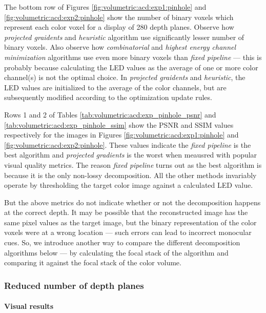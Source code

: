 The bottom row of Figures \ref{fig:volumetric:acd:exp1:pinhole} and \ref{fig:volumetric:acd:exp2:pinhole} show the number of binary voxels which represent each color voxel for a display of 280 depth planes. Observe how \emph{projected graidents} and \emph{heuristic} algorithm use significantly lesser number of binary voxels. Also observe how \emph{combinatorial} and \emph{highest energy channel minimization} algorithms use even more binary voxels than \emph{fixed pipeline} --- this is probably because calculating the LED values as the average of one or more color channel(s) is not the optimal choice. In \emph{projected graidents} and \emph{heuristic}, the LED values are initialized to the average of the color channels, but are subsequently modified according to the optimization update rules. 

Rows 1 and 2 of Tables \ref{tab:volumetric:acd:exp_pinhole_psnr} and \ref{tab:volumetric:acd:exp_pinhole_ssim} show the PSNR and SSIM values respectively for the images in Figures \ref{fig:volumetric:acd:exp1:pinhole} and \ref{fig:volumetric:acd:exp2:pinhole}. These values indicate the \emph{fixed pipeline} is the best algorithm and \emph{projected gradients} is the worst when meausred with popular visual quality metrics. The reason \emph{fixed pipeline} turns out as the best algorithm is because it is the only non-lossy decomposition. All the other methods invariably operate by thresholding the target color image against a calculated LED value. 

But the above metrics do not indicate whether or not the decomposition happens at the correct depth. It may be possible that the reconstructed image has the same pixel values as the target image, but the binary representation of the color voxels were at a wrong location --- such errors can lead to incorrect monocular cues. So, we introduce another way to compare the different decomposition algorithms below --- by calculating the focal stack of the algorithm and comparing it against the focal stack of the color volume. 

\subsubsection{Reduced number of depth planes}




\paragraph{Visual results}

